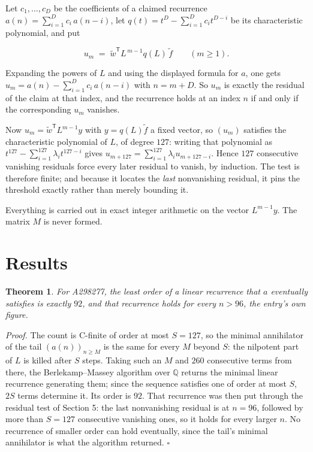 \documentclass[11pt]{article}
\newtheorem{theorem}{Theorem}
\theoremstyle{definition}
\begin{document}
Let $c_1,\dots,c_D$ be the coefficients of a claimed recurrence $a(n) = \sum_{i=1}^{D} c_i\,a(n-i)$, let $q(t) = t^{D} - \sum_{i=1}^{D} c_i t^{D-i}$ be its characteristic polynomial, and put

\[u_m \;=\; \tilde w^{\mathsf T} L^{\,m-1} q(L)\,\tilde f \qquad (m \ge 1).\]

Expanding the powers of $L$ and using the displayed formula for $a$, one gets $u_m = a(n) - \sum_{i=1}^{D} c_i\,a(n-i)$ with $n = m + D$. So $u_m$ is exactly the residual of the claim at that index, and the recurrence holds at an index $n$ if and only if the corresponding $u_m$ vanishes.

Now $u_m = \tilde w^{\mathsf T} L^{m-1} y$ with $y = q(L)\tilde f$ a fixed vector, so $(u_m)$ satisfies the characteristic polynomial of $L$, of degree $127$: writing that polynomial as $t^{127} - \sum_{i=1}^{127} \lambda_i t^{127-i}$ gives $u_{m+127} = \sum_{i=1}^{127} \lambda_i u_{m+127-i}$. Hence $127$ consecutive vanishing residuals force every later residual to vanish, by induction. The test is therefore finite; and because it locates the {\itshape last} nonvanishing residual, it pins the threshold exactly rather than merely bounding it.

Everything is carried out in exact integer arithmetic on the vector $L^{m-1}y$. The matrix $M$ is never formed.

\section{Results}

\begin{theorem} For A298277, the least order of a linear recurrence that $a$ eventually satisfies is exactly $92$, and that recurrence holds for every $n > 96$, the entry's own figure.\end{theorem}

{\itshape Proof.} The count is C-finite of order at most $S = 127$, so the minimal annihilator of the tail $(a(n))_{n \ge M}$ is the same for every $M$ beyond $S$: the nilpotent part of $L$ is killed after $S$ steps. Taking such an $M$ and $260$ consecutive terms from there, the Berlekamp--Massey algorithm over $\mathbb{Q}$ returns the minimal linear recurrence generating them; since the sequence satisfies one of order at most $S$, $2S$ terms determine it. Its order is $92$. That recurrence was then put through the residual test of Section 5: the last nonvanishing residual is at $n = 96$, followed by more than $S = 127$ consecutive vanishing ones, so it holds for every larger $n$. No recurrence of smaller order can hold eventually, since the tail's minimal annihilator is what the algorithm returned. $\square$
\end{document}
